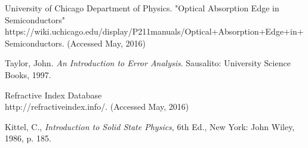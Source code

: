 \documentclass{article}
\begin{document}
\begin{thebibliography}{10}

		University of Chicago Department of Physics. "Optical Absorption Edge in Semiconductors"\\
		https://wiki.uchicago.edu/display/P211manuals/Optical+Absorption+Edge+in+Semiconductors. (Accessed May, 2016)

		Taylor, John. \emph{An Introduction to Error Analysis}. Sausalito: University Science Books, 1997.

		Refractive Index Database\\
		http://refractiveindex.info/. (Accessed May, 2016)

		Kittel, C., \emph{Introduction to Solid State Physics}, 6th Ed., New York: John Wiley, 1986, p. 185.

\end{thebibliography}
\end{document}
